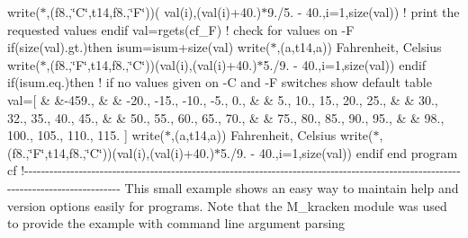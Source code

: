 \begin{DoxyCompactItemize}
write($\ast$,\textquotesingle{}(f8.,\char`\"{}\+C\char`\"{},t14,f8.,\char`\"{}\+F\char`\"{})\textquotesingle{})( val(i),(val(i)+40.)$\ast$9./5. -\/ 40.,i=1,size(val)) ! print the requested values endif val=rgets(\textquotesingle{}cf\+\_\+\+F\textquotesingle{}) ! check for values on -\/\+F if(size(val).\+gt.)then isum=isum+size(val) write($\ast$,\textquotesingle{}(a,t14,a)\textquotesingle{}) \textquotesingle{}\+Fahrenheit\textquotesingle{}, \textquotesingle{}\+Celsius\textquotesingle{} write($\ast$,\textquotesingle{}(f8.,\char`\"{}\+F\char`\"{},t14,f8.,\char`\"{}\+C\char`\"{})\textquotesingle{})(val(i),(val(i)+40.)$\ast$5./9. -\/ 40.,i=1,size(val)) endif if(isum.\+eq.)then ! if no values given on -\/\+C and -\/\+F switches show default table val=\mbox{[} \& \&-\/459., \& \& -\/20., -\/15., -\/10., -\/5., 0., \& \& 5., 10., 15., 20., 25., \& \& 30., 32., 35., 40., 45., \& \& 50., 55., 60., 65., 70., \& \& 75., 80., 85., 90., 95., \& \& 98., 100., 105., 110., 115. \mbox{]} write($\ast$,\textquotesingle{}(a,t14,a)\textquotesingle{}) \textquotesingle{}\+Fahrenheit\textquotesingle{}, \textquotesingle{}\+Celsius\textquotesingle{} write($\ast$,\textquotesingle{}(f8.,\char`\"{}\+F\char`\"{},t14,f8.,\char`\"{}\+C\char`\"{})\textquotesingle{})(val(i),(val(i)+40.)$\ast$5./9. -\/ 40.,i=1,size(val)) endif end program cf !-\/-\/-\/-\/-\/-\/-\/-\/-\/-\/-\/-\/-\/-\/-\/-\/-\/-\/-\/-\/-\/-\/-\/-\/-\/-\/-\/-\/-\/-\/-\/-\/-\/-\/-\/-\/-\/-\/-\/-\/-\/-\/-\/-\/-\/-\/-\/-\/-\/-\/-\/-\/-\/-\/-\/-\/-\/-\/-\/-\/-\/-\/-\/-\/-\/-\/-\/-\/-\/-\/-\/-\/-\/-\/-\/-\/-\/-\/-\/-\/-\/-\/-\/-\/-\/-\/-\/-\/-\/-\/-\/-\/-\/-\/-\/-\/-\/-\/-\/-\/-\/-\/-\/-\/-\/-\/-\/-\/-\/-\/-\/-\/-\/-\/-\/-\/-\/-\/-\/-\/-\/-\/-\/-\/-\/-\/-\/-\/-\/-\/-\/ This small example shows an easy way to maintain help and version options easily for programs. Note that the M\+\_\+kracken module was used to provide the example with command line argument parsing
\end{DoxyCompactItemize}

